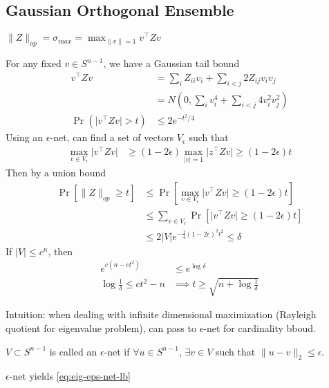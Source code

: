 \subsection{Gaussian Orthogonal Ensemble}

$\|Z\|_{op} = \sigma_{max} = \max_{\|v\|=1} v^\top Z v$

For any fixed $v \in S^{n-1}$, we have a Gaussian tail bound
\begin{align}
  v^\top Z v
  &= \sum_i Z_{ii} v_i + \sum_{i < j} 2 Z_{ij} v_i v_j \\
  &= N(0, \sum_i v_i^4 + \sum_{i < j} 4 v_i^2 v_j^2 ) \\
  \Pr(\lvert v^\top Z v \rvert > t) &\leq 2 e^{-t^2 / 4}
\end{align}
Using an $\epsilon$-net, can find a set of vectors $V_{\epsilon}$ such that
\begin{align}
  \max_{v \in V_\epsilon} \lvert v^\top Z v \rvert
  &\geq (1 - 2 \epsilon) \max_{\lvert v \rvert = 1} \lvert z^\top Z v \rvert \geq (1 - 2 \epsilon) t
  \label{eq:eig-eps-net-lb}
\end{align}
Then by a union bound
\begin{align}
  \Pr[ \|Z\|_{op} \geq t ]
  &\leq \Pr[ \max_{v \in V_\epsilon} \lvert v^\top Z v \rvert \geq (1 - 2\epsilon) t ] \\
  &\leq \sum_{v \in V_\epsilon} \Pr[ \lvert v^\top Z v \rvert \geq (1 - 2\epsilon) t ] \\
  &\leq 2 \lvert V \rvert e^{-\frac{1}{4}(1 - 2 \epsilon)^2 t^2} \leq \delta
\end{align}
If $\lvert V \rvert \leq c^n$, then
\begin{align}
  e^{c (n - c t^2)} &\leq e^{\log \delta} \\
  \log \frac{1}{\delta} \leq c t^2 - n &\implies t \geq \sqrt{n + \log \frac{1}{\delta}}
\end{align}

Intuition: when dealing with infinite dimensional maximization (Rayleigh quotient for eigenvalue problem),
can pass to $\epsilon$-net for cardinality bboud.

\begin{definition}[Covering]
  $V \subset S^{n-1}$ is called an $\epsilon$-net if $\forall u \in S^{n-1}$,
  $\exists v \in V$ such that $\|u - v\|_2 \leq \epsilon$.
\end{definition}

\begin{theorem}
  $\epsilon$-net yields \cref{eq:eig-eps-net-lb}
\end{theorem}

